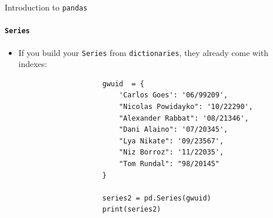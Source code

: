 \documentclass[notes,11pt, aspectratio=169, xcolor=table]{beamer}
\begin{document}
        \begin{frame}[fragile=singleslide]{Introduction to \texttt{pandas}}
        \framesubtitle{\texttt{Series}}
            
             \begin{itemize}
    
                \item If you build your \texttt{Series} from \texttt{dictionaries}, they already come with indexes:
    
                    \begin{verbatim}
                    gwuid  = {
                        'Carlos Goes': '06/99209',
                        "Nicolas Powidayko": '10/22290',
                        "Alexander Rabbat": '08/21346',
                        "Dani Alaino": '07/20345',
                        "Lya Nikate": '09/23567',
                        "Niz Borroz": '11/22035',
                        "Tom Rundal": "98/20145"
                    }
                    
                    series2 = pd.Series(gwuid)
                    print(series2)

                    \end{verbatim}
                
                    
            \end{itemize}             
    
        \end{frame}    
\end{document}
